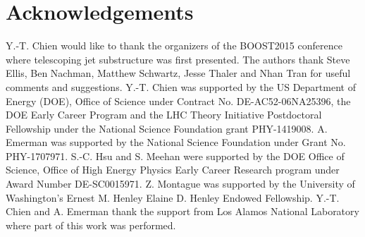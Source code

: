 \documentclass[aps,prl,floatfix,preprintnumbers,twocolumn,groupedaddress,nofootinbib]{revtex4-1}
\begin{document}
\section{Acknowledgements}
Y.-T. Chien would like to thank the organizers of the BOOST2015 conference where telescoping jet substructure was first presented. The authors thank Steve Ellis, Ben Nachman, Matthew Schwartz, Jesse Thaler and Nhan Tran for useful comments and suggestions. Y.-T. Chien was supported by the US Department of Energy (DOE), Office of Science under Contract No. DE-AC52-06NA25396, the DOE Early Career Program and the LHC Theory Initiative Postdoctoral Fellowship under the National Science Foundation grant PHY-1419008. A. Emerman was supported by the National Science Foundation under Grant No. PHY-1707971. S.-C. Hsu and S. Meehan were supported by the DOE Office of Science, Office of High Energy Physics Early Career Research program under Award Number DE-SC0015971. Z. Montague was supported by the University of Washington's Ernest M. Henley \text{\&} Elaine D. Henley Endowed Fellowship. Y.-T. Chien and A. Emerman thank the support from Los Alamos National Laboratory where part of this work was performed.


\end{document}
